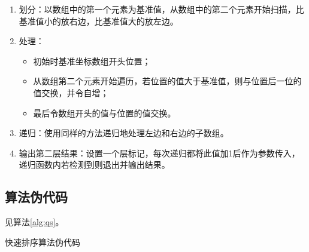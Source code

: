 \begin{enumerate}
    \item 划分：以数组中的第一个元素为基准值，从数组中的第二个元素开始扫描，比基准值小的放右边，比基准值大的放左边。
    \item 处理：
    \begin{itemize}
        \item 初始时基准坐标数组开头位置；
        \item {}从数组第二个元素开始遍历，若位置的值大于基准值，则与位置后一位的值交换，并令自增；
        \item 最后令数组开头的值与位置的值交换。
    \end{itemize}
    \item 递归：使用同样的方法递归地处理左边和右边的子数组。
    \item 输出第二层结果：设置一个层标记，每次递归都将此值加1后作为参数传入，递归函数内若检测到则退出并输出结果。
\end{enumerate}

\subsection{算法伪代码}
见算法\ref{alg:qs}。
\begin{algorithm}[t]
\caption{快速排序算法伪代码}\label{alg:qs}
\end{algorithm}